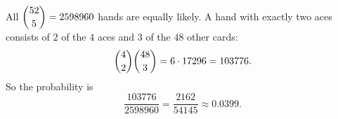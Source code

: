 All $\dbinom{52}{5}=2598960$ hands are equally likely. A hand with exactly two aces consists of $2$ of the $4$ aces and $3$ of the $48$ other cards:
\[
\dbinom42\dbinom{48}{3}=6\cdot17296=103776 .
\]
So the probability is
\[
\dfrac{103776}{2598960}=\boxed{\dfrac{2162}{54145}}\approx0.0399 .
\]
